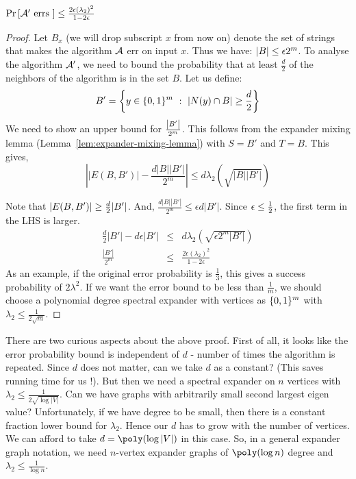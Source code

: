 \begin{lemma}
$\Pr\left[{\cal A}' \textrm{ errs }\right] \le \frac{2 \epsilon (\lambda_2)^2 }{1-2\epsilon}$
\end{lemma}
\begin{proof}
Let $B_x$ (we will drop subscript $x$ from now on) denote the set of strings that makes the algorithm ${\cal A}$ err on input $x$. Thus we have: $\left|B \right| \le \epsilon 2^m$.
 To analyse the algorithm ${\cal A}'$, we need to bound the probability that at least $\frac{d}{2}$ of the neighbors of the algorithm is in the set $B$. Let us define:
$$B' = \left\{ y \in \{0,1\}^m ~:~ \left|N(y) \cap B \right| \ge \frac{d}{2} \right\}$$
We need to show an upper bound for $\frac{\left|B' \right|}{2^m}$. This follows from the expander mixing lemma (Lemma~\ref{lem:expander-mixing-lemma}) with $S = B'$ and $T = B$. This gives, 
$$\left||E(B,B')|-\frac{d|B||B'|}{2^m}\right| \le d\lambda_2 \left(\sqrt{|B||B'|}\right)$$

\noindent Note that $\left|E(B,B') \right| \ge \frac{d}{2}|B'|$. And, $\frac{d|B||B'|}{2^m} \le \epsilon d |B'|$. Since $\epsilon \le \frac{1}{2}$, the first term in the LHS is larger.
\begin{eqnarray*}
\frac{d}{2}|B'| - d\epsilon|B'| & \le & d \lambda_2 \left(\sqrt{\epsilon2^m|B'|}\right) \\
\frac{|B'|}{2^m} & \le & \frac{2 \epsilon (\lambda_2)^2 }{1-2\epsilon}
\end{eqnarray*}
As an example, if the original error probability is $\frac{1}{3}$, this gives a success probability of $2\lambda^2$. If we want the error bound to be less than $\frac{1}{m}$, we should choose a polynomial degree spectral expander with vertices as $\{0,1\}^m$ with $\lambda_2 \le \frac{1}{2\sqrt{m}}$.
\end{proof}

\begin{remark}
There are two curious aspects about the above proof. First of all, it looks like the error probability bound is independent of $d$ -  number of times the algorithm is repeated. Since $d$ does not matter, can we take $d$ as a constant? (This saves running time for us !).
But then we need a spectral expander on $n$ vertices with $\lambda_2 \le \frac{1}{2\sqrt{\log |V|}}$. Can we have graphs with arbitrarily small second largest eigen value? Unfortunately, if we have degree to be small, then there is a constant fraction lower bound for $\lambda_2$. Hence our $d$ has to grow with the number of vertices. We can afford to take $d = \poly(\log |V|)$ in this case. So, in a general expander graph notation, we need $n$-vertex expander graphs of $\poly(\log n)$ degree and $\lambda_2 \le \frac{1}{\log n}$.
\end{remark}


